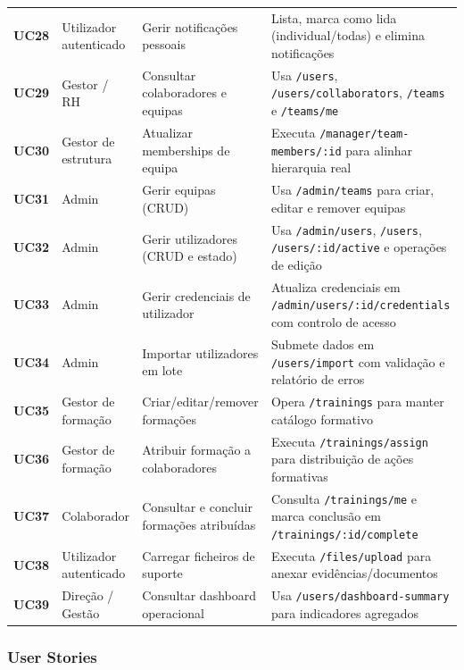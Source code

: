 \documentclass[11pt,a4paper,twoside]{article}
\begin{document}
\begin{longtable}{>{\small\centering\arraybackslash\bfseries}p{0.8cm} >{\small}p{2.4cm} >{\small}p{3.7cm} >{\small}p{6.9cm}}
UC28 & Utilizador autenticado & Gerir notificações pessoais & Lista, marca como lida (individual/todas) e elimina notificações \\
UC29 & Gestor / RH & Consultar colaboradores e equipas & Usa \texttt{/users}, \texttt{/users/collaborators}, \texttt{/teams} e \texttt{/teams/me} \\
UC30 & Gestor de estrutura & Atualizar memberships de equipa & Executa \texttt{/manager/team-members/:id} para alinhar hierarquia real \\
UC31 & Admin & Gerir equipas (CRUD) & Usa \texttt{/admin/teams} para criar, editar e remover equipas \\
UC32 & Admin & Gerir utilizadores (CRUD e estado) & Usa \texttt{/admin/users}, \texttt{/users}, \texttt{/users/:id/active} e operações de edição \\
UC33 & Admin & Gerir credenciais de utilizador & Atualiza credenciais em \texttt{/admin/users/:id/credentials} com controlo de acesso \\
UC34 & Admin & Importar utilizadores em lote & Submete dados em \texttt{/users/import} com validação e relatório de erros \\
UC35 & Gestor de formação & Criar/editar/remover formações & Opera \texttt{/trainings} para manter catálogo formativo \\
UC36 & Gestor de formação & Atribuir formação a colaboradores & Executa \texttt{/trainings/assign} para distribuição de ações formativas \\
UC37 & Colaborador & Consultar e concluir formações atribuídas & Consulta \texttt{/trainings/me} e marca conclusão em \texttt{/trainings/:id/complete} \\
UC38 & Utilizador autenticado & Carregar ficheiros de suporte & Executa \texttt{/files/upload} para anexar evidências/documentos \\
UC39 & Direção / Gestão & Consultar dashboard operacional & Usa \texttt{/users/dashboard-summary} para indicadores agregados \\
\bottomrule
\end{longtable}

\subsubsection{User Stories}
\end{document}
